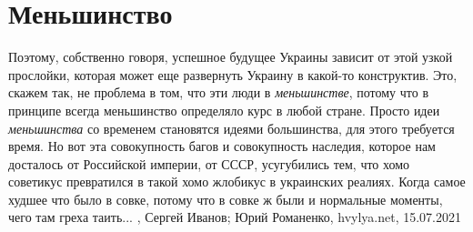  
 
 
 
 
\chapter{Меньшинство}
\label{sec:slova.menshinstvo}

Поэтому, собственно говоря, успешное будущее Украины зависит от этой узкой
прослойки, которая может еще развернуть Украину в какой-то конструктив. Это,
скажем так, не проблема в том, что эти люди в \emph{меньшинстве}, потому что в
принципе всегда меньшинство определяло курс в любой стране. Просто идеи
\emph{меньшинства} со временем становятся идеями большинства, для этого
требуется время.  Но вот эта совокупность багов и совокупность наследия,
которое нам досталось от Российской империи, от СССР, усугубились тем, что хомо
советикус превратился в такой хомо жлобикус в украинских реалиях. Когда самое
худшее что было в совке, потому что в совке ж были и нормальные моменты, чего
там греха таить...
, 
Сергей Иванов; Юрий Романенко, hvylya.net, 15.07.2021

